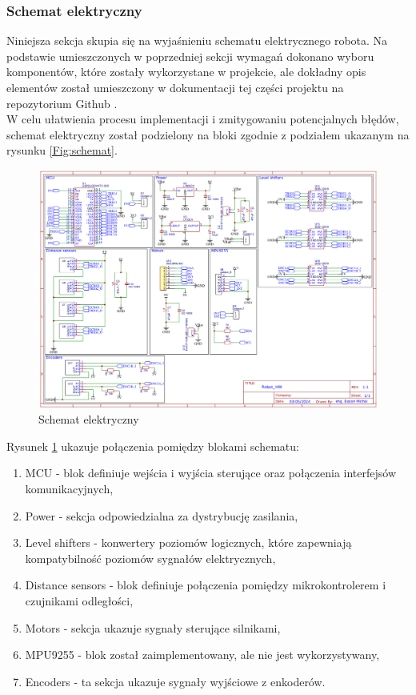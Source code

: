 \documentclass[12pt,twoside]{article}
\begin{document}
\newpage

\subsubsection{Schemat elektryczny}
Niniejsza sekcja skupia się na wyjaśnieniu schematu elektrycznego robota. 
Na podstawie umieszczonych w poprzedniej sekcji wymagań dokonano wyboru komponentów, które zostały wykorzystane w projekcie, ale dokładny opis elementów został umieszczony w dokumentacji tej części projektu na repozytorium Github \cite{repo}.\\
\newline
W celu ułatwienia procesu implementacji i zmitygowaniu potencjalnych błędów, schemat elektryczny został podzielony na bloki zgodnie z podziałem ukazanym na rysunku \ref{Fig:schemat}.



\begin{figure}[ht]%
 \centering%
 \includegraphics[width=12cm]{figures/engHW/robotschem.png}%
 \caption{Schemat elektryczny}%
 \label{Fig:elektryczny}%
\end{figure}

Rysunek \ref{Fig:elektryczny} ukazuje połączenia pomiędzy blokami schematu:

\begin{enumerate}[label=\alph*), leftmargin=1.25cm]
	\item MCU - blok definiuje wejścia i wyjścia sterujące oraz połączenia interfejsów komunikacyjnych,
	\item Power - sekcja odpowiedzialna za dystrybucję zasilania,
	\item Level shifters - konwertery poziomów logicznych, które zapewniają kompatybilność poziomów sygnałów elektrycznych,
	\item Distance sensors - blok definiuje połączenia pomiędzy mikrokontrolerem i czujnikami odległości,
	\item Motors - sekcja ukazuje sygnały sterujące silnikami,
	\item MPU9255 - blok został zaimplementowany, ale nie jest wykorzystywany,
	\item Encoders - ta sekcja ukazuje sygnały wyjściowe z enkoderów.
\end{enumerate}
\end{document}
